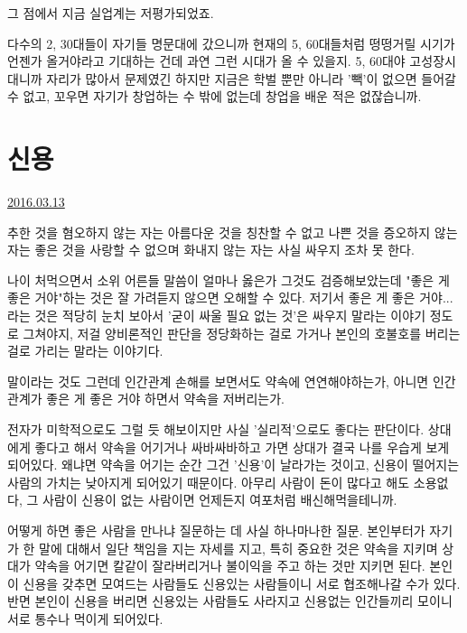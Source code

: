 그 점에서 지금 실업계는 저평가되었죠.
\vspace{5mm}

다수의 2, 30대들이 자기들 명문대에 갔으니까 현재의 5, 60대들처럼 떵떵거릴 시기가 언젠가 올거야라고 기대하는 건데
과연 그런 시대가 올 수 있을지. 5, 60대야 고성장시대니까 자리가 많아서 문제였긴 하지만
지금은 학벌 뿐만 아니라 '빽'이 없으면 들어갈 수 없고, 꼬우면 자기가 창업하는 수 밖에 없는데 창업을 배운 적은 없잖습니까.
\vspace{5mm}






\section{신용}
\href{https://www.kockoc.com/Apoc/675112}{2016.03.13}

\vspace{5mm}

추한 것을 혐오하지 않는 자는 아름다운 것을 칭찬할 수 없고
나쁜 것을 증오하지 않는 자는 좋은 것을 사랑할 수 없으며
화내지 않는 자는 사실 싸우지 조차 못 한다.
\vspace{5mm}

나이 처먹으면서 소위 어른들 말씀이 얼마나 옳은가 그것도 검증해보았는데
"좋은 게 좋은 거야"하는 것은 잘 가려듣지 않으면 오해할 수 있다.
저기서 좋은 게 좋은 거야... 라는 것은 적당히 눈치 보아서 '굳이 싸울 필요 없는 것'은 싸우지 말라는 이야기 정도로 그쳐야지,
저걸 양비론적인 판단을 정당화하는 걸로 가거나 본인의 호불호를 버리는 걸로 가리는 말라는 이야기다.
\vspace{5mm}

말이라는 것도 그런데
인간관계 손해를 보면서도 약속에 연연해야하는가,
아니면 인간관계가 좋은 게 좋은 거야 하면서 약속을 저버리는가.
\vspace{5mm}

전자가 미학적으로도 그럴 듯 해보이지만 사실 '실리적'으로도 좋다는 판단이다.
상대에게 좋다고 해서 약속을 어기거나 싸바싸바하고 가면 상대가 결국 나를 우습게 보게 되어있다.
왜냐면 약속을 어기는 순간 그건 '신용'이 날라가는 것이고, 신용이 떨어지는 사람의 가치는 낮아지게 되어있기 때문이다.
아무리 사람이 돈이 많다고 해도 소용없다, 그 사람이 신용이 없는 사람이면 언제든지 여포처럼 배신해먹을테니까.
\vspace{5mm}

어떻게 하면 좋은 사람을 만나냐 질문하는 데 사실 하나마나한 질문.
본인부터가 자기가 한 말에 대해서 일단 책임을 지는 자세를 지고, 특히 중요한 것은 약속을 지키며
상대가 약속을 어기면 칼같이 잘라버리거나 불이익을 주고 하는 것만 지키면 된다.
본인이 신용을 갖추면 모여드는 사람들도 신용있는 사람들이니 서로 협조해나갈 수가 있다.
반면 본인이 신용을 버리면 신용있는 사람들도 사라지고 신용없는 인간들끼리 모이니 서로 통수나 먹이게 되어있다.
\vspace{5mm}

